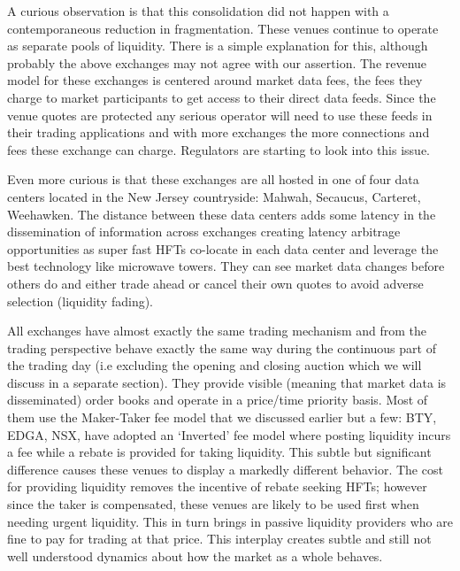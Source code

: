 A curious observation is that this consolidation did not happen with a contemporaneous reduction in fragmentation. These venues continue to operate as separate pools of liquidity. There is a simple explanation for this, although probably the above exchanges may not agree with our assertion. The revenue model for these exchanges is centered around market data fees, the fees they charge to market participants to get access to their direct data feeds. Since the venue quotes are protected any serious operator will need to use these feeds in their trading applications and with more exchanges the more connections and fees these exchange can charge. Regulators are starting to look into this issue.


Even more curious is that these exchanges are all hosted in one of four data centers located in the New Jersey countryside: Mahwah, Secaucus, Carteret, Weehawken. The distance between these data centers adds some latency in the dissemination of information across exchanges creating latency arbitrage opportunities as super fast HFTs co-locate in each data center and leverage the best technology like microwave towers. They can see market data changes before others do and either trade ahead or cancel their own quotes to avoid adverse selection (liquidity fading).


All exchanges have almost exactly the same trading mechanism and from the trading perspective behave exactly the same way during the continuous part of the trading day (i.e excluding the opening and closing auction which we will discuss in a separate section). They provide visible (meaning that market data is disseminated) order books and operate in a price/time priority basis. Most of them use the Maker-Taker fee model that we discussed earlier but a few: BTY, EDGA, NSX, have adopted an `Inverted' fee model where posting liquidity incurs a fee while a rebate is provided for taking liquidity. This subtle but significant difference causes these venues to display a markedly different behavior. The cost for providing liquidity removes the incentive of rebate seeking HFTs; however since the taker is compensated, these venues are likely to be used first when needing urgent liquidity. This in turn brings in passive liquidity providers who are fine to pay for trading at that price. This interplay creates subtle and still not well understood dynamics about how the market as a whole behaves.


